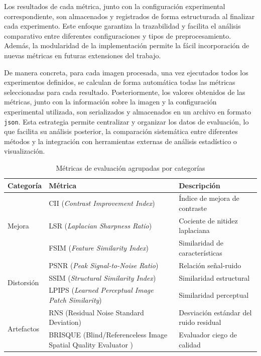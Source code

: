 Los resultados de cada métrica, junto con la configuración experimental correspondiente, son almacenados y registrados de forma estructurada al finalizar cada experimento. Este enfoque garantiza la trazabilidad y facilita el análisis comparativo entre diferentes configuraciones y tipos de preprocesamiento. Además, la modularidad de la implementación permite la fácil incorporación de nuevas métricas en futuras extensiones del trabajo.

De manera concreta, para cada imagen procesada, una vez ejecutados todos los experimentos definidos, se calculan de forma automática todas las métricas seleccionadas para cada resultado. Posteriormente, los valores obtenidos de las métricas, junto con la información sobre la imagen y la configuración experimental utilizada, son serializados y almacenados en un archivo en formato \texttt{json}. Esta estrategia permite centralizar y organizar los datos de evaluación, lo que facilita su análisis posterior, la comparación sistemática entre diferentes métodos y la integración con herramientas externas de análisis estadístico o visualización.

\begin{table}[h]
    \centering
    \caption{Métricas de evaluación agrupadas por categorías\cite{Metrics}}
    \label{tab:metricas}
    \begin{tabular}{p{3cm}p{8cm}p{3cm}}
    \toprule
    \textbf{Categoría} & \textbf{Métrica} & \textbf{Descripción} \\ 
    \midrule
    \multirow{3}{*}{Mejora} 
    & CII (\textit{Contrast Improvement Index}) & Índice de mejora de contraste \\
    & LSR (\textit{Laplacian Sharpness Ratio}) & Cociente de nitidez laplaciana \\
    & FSIM (\textit{Feature Similarity Index}) & Similaridad de características \\
    \midrule

    \multirow{3}{*}{Distorsión}
    & PSNR (\textit{Peak Signal-to-Noise Ratio}) & Relación señal-ruido \\
    & SSIM (\textit{Structural Similarity Index}) & Similaridad estructural \\
    & LPIPS (\textit{Learned Perceptual Image Patch Similarity}) & Similaridad perceptual \\
    \midrule

    \multirow{2}{*}{Artefactos}
    & RNS (Residual Noise Standard Deviation) & Desviación estándar del ruido residual \\
    & BRISQUE (Blind/Referenceless Image Spatial Quality Evaluator \cite{BRISQUE}) & Evaluador ciego de calidad \\
    \bottomrule
    \end{tabular}
\end{table}

